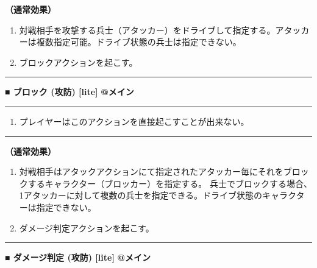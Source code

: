 \documentclass[twocolumn,a5paper,papersize,10pt]{jarticle}
\begin{document}
{\bf（通常効果）}


\vspace{-1zh}%
\begin{enumerate}
\setlength{\leftskip}{-0.3cm}
\setlength{\parskip}{0pt} %

\item 対戦相手を攻撃する兵士（アタッカー）をドライブして指定する。アタッカーは複数指定可能。ドライブ状態の兵士は指定できない。

\item ブロックアクションを起こす。
\vspace{-1zh}%
\end{enumerate}
\vspace{2mm} %
\hrule height 0.5mm depth 0mm width 66.5mm %
\vspace{1mm} %
{\normalsize\bf ■ ブロック {\scriptsize (攻防) [lite]}} %
\hfill 
{\small\bf @メイン }


\vspace{1mm}%
\hrule height 0.1mm depth 0mm width 66.5mm %
\vspace{1mm}%


\vspace{-1zh}%
\begin{enumerate}
\renewcommand{\labelenumi}{※}
\setlength{\leftskip}{-0.3cm}
\setlength{\itemsep}{0pt} %
\setlength{\parskip}{0pt} %

\item プレイヤーはこのアクションを直接起こすことが出来ない。

\vspace{-3mm}%
\end{enumerate}
\vspace{1mm}%
\hrule height 0.1mm depth 0mm width 66.5mm %
\vspace{1mm}%

{\bf（通常効果）}


\vspace{-1zh}%
\begin{enumerate}
\setlength{\leftskip}{-0.3cm}
\setlength{\parskip}{0pt} %

\item 対戦相手はアタックアクションにて指定されたアタッカー毎にそれをブロックするキャラクター（ブロッカー）を指定する。 兵士でブロックする場合、1アタッカーに対して複数の兵士を指定できる。ドライブ状態のキャラクターは指定できない。

\item ダメージ判定アクションを起こす。
\vspace{-1zh}%
\end{enumerate}
\vspace{2mm} %
\hrule height 0.5mm depth 0mm width 66.5mm %
\vspace{1mm} %
{\normalsize\bf ■ ダメージ判定 {\scriptsize (攻防) [lite]}} %
\hfill 
{\small\bf @メイン }
\end{document}
